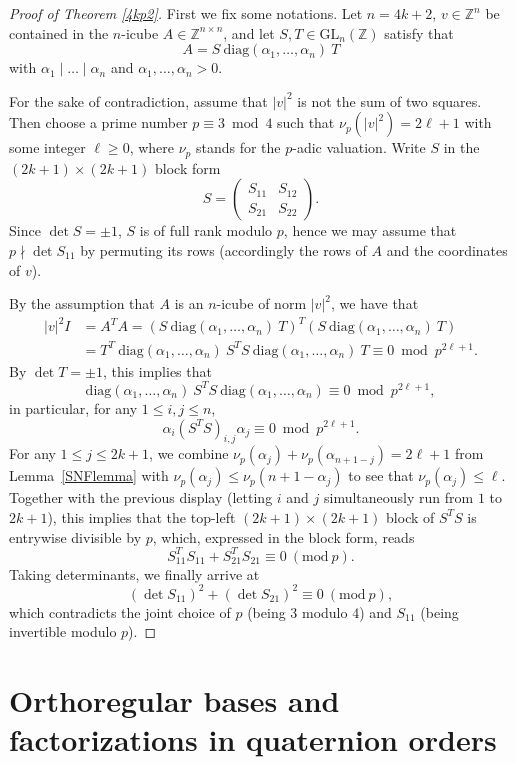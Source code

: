 \documentclass[11pt]{amsart}
\newcommand{\Mod}[1]{~(\mathrm{mod}~#1)}
\newcommand{\diag}{\mathrm{diag}}
\newcommand{\ZZ}{\mathbb{Z}}
\newcommand{\GL}{\mathrm{GL}}
\theoremstyle{definition}
\theoremstyle{remark}
\begin{document}
\begin{proof}[Proof of Theorem \ref{4kp2}] First we fix some notations. Let $n=4k+2$, $v\in\ZZ^n$ be contained in the $n$-icube $A\in\ZZ^{n\times n}$, and let $S,T\in\GL_n(\ZZ)$ satisfy that
\[
A=S\ \diag(\alpha_1,\dotsc,\alpha_n)\ T
\]
with $\alpha_1\mid \dotsc\mid \alpha_n$ and $\alpha_1,\dotsc,\alpha_n>0$.

For the sake of contradiction, assume that $|v|^2$ is not the sum of two squares. Then choose a prime number $p\equiv 3\bmod 4$ such that $\nu_p(|v|^2)=2\ell+1$ with some integer $\ell\geq 0$, where $\nu_p$ stands for the $p$-adic valuation. Write $S$ in the $(2k+1)\times (2k+1)$ block form
\[
S=\begin{pmatrix}
S_{11} & S_{12} \\ S_{21} & S_{22}
\end{pmatrix}.
\]
Since $\det S=\pm 1$, $S$ is of full rank modulo $p$, hence we may assume that $p\nmid \det S_{11}$ by permuting its rows (accordingly the rows of $A$ and the coordinates of $v$).

By the assumption that $A$ is an $n$-icube of norm $|v|^2$, we have that
\[
\begin{split}
|v|^2 I &= A^T A = (S\ \diag(\alpha_1,\dotsc,\alpha_n)\ T)^T (S\ \diag(\alpha_1,\dotsc,\alpha_n)\ T) \\ &= T^T\ \diag(\alpha_1,\dotsc,\alpha_n)\ S^T S\  \diag(\alpha_1,\dotsc,\alpha_n)\ T\equiv 0 \bmod p^{2\ell+1}.
\end{split}
\]
By $\det T=\pm 1$, this implies that
\[
\diag(\alpha_1,\dotsc,\alpha_n)\ S^T S\  \diag(\alpha_1,\dotsc,\alpha_n) \equiv 0 \bmod p^{2\ell+1},
\]
in particular, for any $1\leq i,j\leq n$,
\[
\alpha_i (S^T S)_{i,j}\alpha_j \equiv 0 \bmod p^{2\ell+1}.
\]
For any $1\leq j\leq 2k+1$, we combine $\nu_p(\alpha_j)+\nu_p(\alpha_{n+1-j})=2\ell+1$ from Lemma~\ref{SNFlemma} with $\nu_p(\alpha_j)\leq \nu_p(n+1-\alpha_j)$ to see that $\nu_p(\alpha_j)\leq \ell$. Together with the previous display (letting $i$ and $j$ simultaneously run from $1$ to $2k+1$), this implies that the top-left $(2k+1)\times (2k+1)$ block of $S^T S$ is entrywise divisible by $p$, which, expressed in the block form, reads
\[
S_{11}^TS_{11}+S_{21}^TS_{21} \equiv 0 \Mod p.
\]
Taking determinants, we finally arrive at
\[
(\det S_{11})^2+(\det S_{21})^2 \equiv 0 \Mod p,
\]
which contradicts the joint choice of $p$ (being $3$ modulo $4$) and $S_{11}$ (being invertible modulo $p$).
\end{proof}


\section{Orthoregular bases and factorizations in quaternion orders}\label{QuaternionSection}
\end{document}
